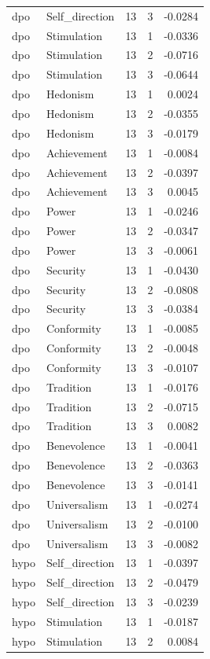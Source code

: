 \begin{tabular}{llrrr}
dpo & Self\_direction & 13 & 3 & -0.0284 \\
dpo & Stimulation & 13 & 1 & -0.0336 \\
dpo & Stimulation & 13 & 2 & -0.0716 \\
dpo & Stimulation & 13 & 3 & -0.0644 \\
dpo & Hedonism & 13 & 1 & 0.0024 \\
dpo & Hedonism & 13 & 2 & -0.0355 \\
dpo & Hedonism & 13 & 3 & -0.0179 \\
dpo & Achievement & 13 & 1 & -0.0084 \\
dpo & Achievement & 13 & 2 & -0.0397 \\
dpo & Achievement & 13 & 3 & 0.0045 \\
dpo & Power & 13 & 1 & -0.0246 \\
dpo & Power & 13 & 2 & -0.0347 \\
dpo & Power & 13 & 3 & -0.0061 \\
dpo & Security & 13 & 1 & -0.0430 \\
dpo & Security & 13 & 2 & -0.0808 \\
dpo & Security & 13 & 3 & -0.0384 \\
dpo & Conformity & 13 & 1 & -0.0085 \\
dpo & Conformity & 13 & 2 & -0.0048 \\
dpo & Conformity & 13 & 3 & -0.0107 \\
dpo & Tradition & 13 & 1 & -0.0176 \\
dpo & Tradition & 13 & 2 & -0.0715 \\
dpo & Tradition & 13 & 3 & 0.0082 \\
dpo & Benevolence & 13 & 1 & -0.0041 \\
dpo & Benevolence & 13 & 2 & -0.0363 \\
dpo & Benevolence & 13 & 3 & -0.0141 \\
dpo & Universalism & 13 & 1 & -0.0274 \\
dpo & Universalism & 13 & 2 & -0.0100 \\
dpo & Universalism & 13 & 3 & -0.0082 \\
hypo & Self\_direction & 13 & 1 & -0.0397 \\
hypo & Self\_direction & 13 & 2 & -0.0479 \\
hypo & Self\_direction & 13 & 3 & -0.0239 \\
hypo & Stimulation & 13 & 1 & -0.0187 \\
hypo & Stimulation & 13 & 2 & 0.0084 \\

\end{tabular}
